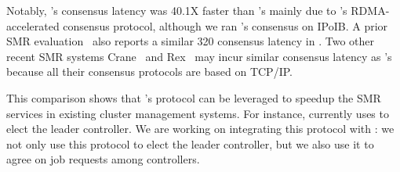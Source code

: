 Notably, \xxx's consensus latency was 40.1X faster than \zookeeper's mainly due 
to \xxx's RDMA-accelerated consensus protocol, although we ran \calvin's 
\zookeeper consensus on IPoIB. A prior SMR evaluation~\cite{dare:hpdc15} also 
reports a similar 320 \us consensus latency in \zookeeper. Two other recent SMR 
systems Crane~\cite{crane:sosp15} and Rex~\cite{rex:eurosys14} may incur 
similar consensus latency as \zookeeper's because all their consensus protocols 
are based on TCP/IP.

This comparison shows that \xxx's \paxos protocol can be leveraged to speedup 
the SMR services in existing cluster management systems. For instance, \mesos 
currently uses \zookeeper to elect the leader controller. We are working on 
integrating this protocol with \mesos: we not only use this protocol to elect 
the leader controller, but we also use it to agree on job requests among 
controllers.







% 

